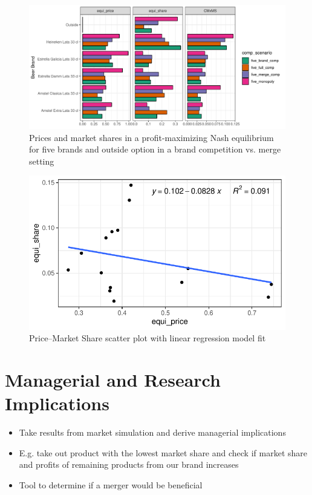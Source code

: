 \documentclass[12pt,a4paper]{article}
\begin{document}
\begin{figure}[ht]
	\centering
  \includegraphics[scale = 0.7]{figures/bar_price_share_brand_merge_5.pdf}
	\caption{Prices and market shares in a profit-maximizing Nash equilibrium for five brands and outside option in a brand competition vs. merge setting}
	\label{fig_bar_five}
\end{figure}

\begin{figure}[ht]
	\centering
  \includegraphics[scale = 0.7]{figures/scatter_price_share_brand_comp_fitted.pdf}
	\caption{Price--Market Share scatter plot with linear regression model fit}
	\label{fig_scatter_brand_comp}
\end{figure}

\section{Managerial and Research Implications}
\begin{itemize}
\item Take results from market simulation and derive managerial implications
\item E.g. take out product with the lowest market share and check if market share and profits of remaining products from our brand increases
\item Tool to determine if a merger would be beneficial
\end{itemize}
\end{document}
